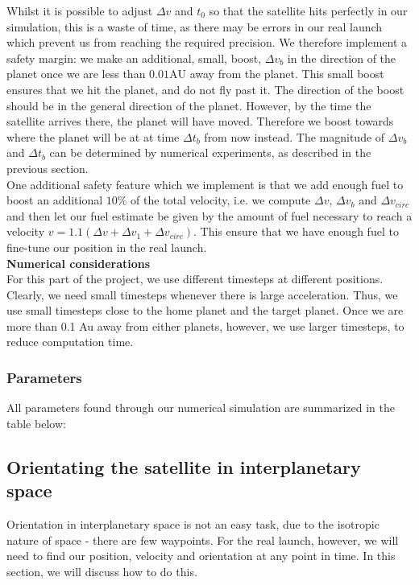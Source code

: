 \documentclass[a4paper,10pt,english]{article}
\begin{document}
Whilst it is possible to adjust $\Delta v$ and $t_0$ so that the satellite hits perfectly in our simulation, this is a waste of time, as there may be errors in our real launch which prevent us from reaching the required precision. We therefore implement a safety margin: we make an additional, small, boost, $\Delta v_b$ in the direction of the planet once we are less than $0.01 \mathrm{AU}$ away from the planet. This small boost ensures that we hit the planet, and do not fly past it. The direction of the boost should be in the general direction of the planet. However, by the time the satellite arrives there, the planet will have moved. Therefore we boost towards where the planet will be at at time $\Delta t_b$ from now  instead. The magnitude of $\Delta v_b$ and $\Delta t_b$ can be determined by numerical experiments, as described in the previous section.\\
\linebreak
One additional safety feature which we implement is that we add enough fuel to boost an additional $10\%$ of the total velocity, i.e. we compute $\Delta v$, $\Delta v_b$ and $\Delta v_{circ}$ and then let our fuel estimate be given by the amount of fuel necessary to reach a velocity $v=1.1(\Delta v+\Delta v_1+\Delta v_{circ})$. This ensure that we have enough fuel to fine-tune our position in the real launch.\\
\linebreak
\textbf{Numerical considerations}\\
For this part of the project, we use different timesteps at different positions. Clearly, we need small timesteps whenever there is large acceleration. Thus, we use small timesteps close to the home planet and the target planet. Once we are more than 0.1 Au away from either planets, however, we use larger timesteps, to reduce computation time.
\subsubsection{Parameters}
All parameters found through our numerical simulation are summarized in the table below:
\subsection{Orientating the satellite in interplanetary space}
Orientation in interplanetary space is not an easy task, due to the isotropic nature of space - there are few waypoints. For the real launch, however, we will need to find our position, velocity and orientation at any point in time. In this section, we will discuss how to do this.
\end{document}
